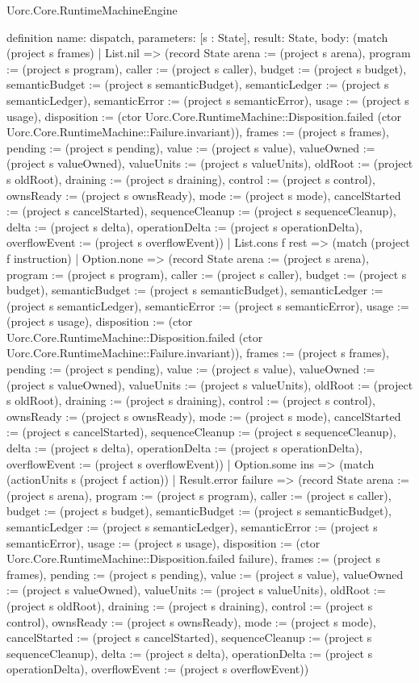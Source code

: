 \begin{lexlean}{Uorc.Core.RuntimeMachineEngine}
\begin{semanticmodule}
definition{
  name: dispatch,
  parameters: [s : State],
  result: State,
  body: (match (project s frames)
    | List.nil => (record State {arena := (project s arena), program := (project s program), caller := (project s caller), budget := (project s budget), semanticBudget := (project s semanticBudget), semanticLedger := (project s semanticLedger), semanticError := (project s semanticError), usage := (project s usage), disposition := (ctor Uorc.Core.RuntimeMachine::Disposition.failed (ctor Uorc.Core.RuntimeMachine::Failure.invariant)), frames := (project s frames), pending := (project s pending), value := (project s value), valueOwned := (project s valueOwned), valueUnits := (project s valueUnits), oldRoot := (project s oldRoot), draining := (project s draining), control := (project s control), ownsReady := (project s ownsReady), mode := (project s mode), cancelStarted := (project s cancelStarted), sequenceCleanup := (project s sequenceCleanup), delta := (project s delta), operationDelta := (project s operationDelta), overflowEvent := (project s overflowEvent)})
    | List.cons f rest => (match (project f instruction)
      | Option.none => (record State {arena := (project s arena), program := (project s program), caller := (project s caller), budget := (project s budget), semanticBudget := (project s semanticBudget), semanticLedger := (project s semanticLedger), semanticError := (project s semanticError), usage := (project s usage), disposition := (ctor Uorc.Core.RuntimeMachine::Disposition.failed (ctor Uorc.Core.RuntimeMachine::Failure.invariant)), frames := (project s frames), pending := (project s pending), value := (project s value), valueOwned := (project s valueOwned), valueUnits := (project s valueUnits), oldRoot := (project s oldRoot), draining := (project s draining), control := (project s control), ownsReady := (project s ownsReady), mode := (project s mode), cancelStarted := (project s cancelStarted), sequenceCleanup := (project s sequenceCleanup), delta := (project s delta), operationDelta := (project s operationDelta), overflowEvent := (project s overflowEvent)})
      | Option.some ins => (match (actionUnits s (project f action))
        | Result.error failure => (record State {arena := (project s arena), program := (project s program), caller := (project s caller), budget := (project s budget), semanticBudget := (project s semanticBudget), semanticLedger := (project s semanticLedger), semanticError := (project s semanticError), usage := (project s usage), disposition := (ctor Uorc.Core.RuntimeMachine::Disposition.failed failure), frames := (project s frames), pending := (project s pending), value := (project s value), valueOwned := (project s valueOwned), valueUnits := (project s valueUnits), oldRoot := (project s oldRoot), draining := (project s draining), control := (project s control), ownsReady := (project s ownsReady), mode := (project s mode), cancelStarted := (project s cancelStarted), sequenceCleanup := (project s sequenceCleanup), delta := (project s delta), operationDelta := (project s operationDelta), overflowEvent := (project s overflowEvent)})
}
\end{semanticmodule}
\end{lexlean}

